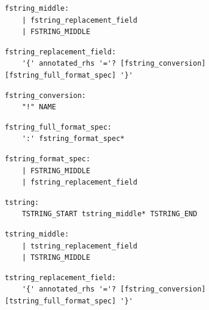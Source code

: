\noindent\textbf{\texttt{}}\par
\begin{lstlisting}
fstring_middle:
    | fstring_replacement_field
    | FSTRING_MIDDLE
\end{lstlisting}

\noindent\textbf{\texttt{}}\par
\begin{lstlisting}
fstring_replacement_field:
    '{' annotated_rhs '='? [fstring_conversion] [fstring_full_format_spec] '}'
\end{lstlisting}

\noindent\textbf{\texttt{}}\par
\begin{lstlisting}
fstring_conversion:
    "!" NAME
\end{lstlisting}

\noindent\textbf{\texttt{}}\par
\begin{lstlisting}
fstring_full_format_spec:
    ':' fstring_format_spec*
\end{lstlisting}

\noindent\textbf{\texttt{}}\par
\begin{lstlisting}
fstring_format_spec:
    | FSTRING_MIDDLE
    | fstring_replacement_field
\end{lstlisting}

\noindent\textbf{\texttt{}}\par
\begin{lstlisting}
tstring:
    TSTRING_START tstring_middle* TSTRING_END
\end{lstlisting}

\noindent\textbf{\texttt{}}\par
\begin{lstlisting}
tstring_middle:
    | tstring_replacement_field
    | TSTRING_MIDDLE
\end{lstlisting}

\noindent\textbf{\texttt{}}\par
\begin{lstlisting}
tstring_replacement_field:
    '{' annotated_rhs '='? [fstring_conversion] [tstring_full_format_spec] '}'
\end{lstlisting}

